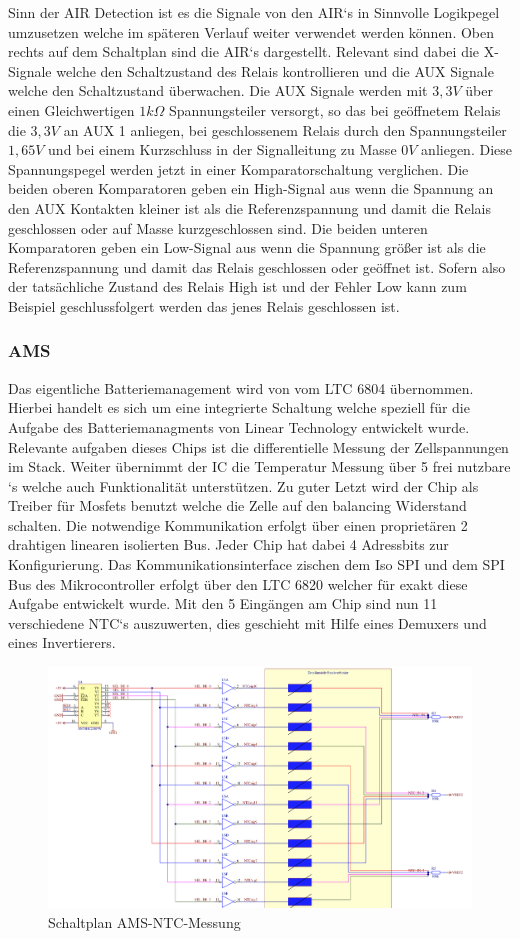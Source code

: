 Sinn der \ac{AIR} Detection ist es die Signale von den \ac{AIR}`s in Sinnvolle Logikpegel umzusetzen welche im späteren Verlauf weiter verwendet werden können. Oben rechts auf dem Schaltplan sind die \ac{AIR}`s dargestellt. Relevant sind dabei die X-Signale welche den Schaltzustand des Relais kontrollieren und die \ac{AUX} Signale welche den Schaltzustand überwachen. Die \ac{AUX} Signale werden mit \ensuremath{3,3V} über einen Gleichwertigen \ensuremath{1 k\Omega} Spannungsteiler versorgt, so das bei geöffnetem Relais die \ensuremath{3,3V} an \ac{AUX} 1 anliegen, bei geschlossenem Relais durch den Spannungsteiler \ensuremath{1,65V} und bei einem Kurzschluss in der Signalleitung zu Masse \ensuremath{0V} anliegen. Diese Spannungspegel werden jetzt in einer Komparatorschaltung verglichen. Die beiden oberen Komparatoren geben ein High-Signal aus wenn die Spannung an den \ac{AUX} Kontakten kleiner ist als die Referenzspannung und damit die Relais geschlossen oder auf Masse kurzgeschlossen sind. Die beiden unteren Komparatoren geben ein Low-Signal aus wenn die Spannung größer ist als die Referenzspannung und damit das Relais geschlossen oder geöffnet ist. Sofern also der tatsächliche Zustand des Relais High ist und der Fehler Low kann zum Beispiel geschlussfolgert werden das jenes Relais geschlossen ist.
\FloatBarrier
\subsubsection{\ac{AMS}}
Das eigentliche Batteriemanagement wird von vom LTC 6804 übernommen. Hierbei handelt es sich um eine integrierte Schaltung welche speziell für die Aufgabe des Batteriemanagments von Linear Technology entwickelt wurde. Relevante aufgaben dieses Chips ist die differentielle Messung der Zellspannungen im Stack. Weiter übernimmt der IC die Temperatur Messung über 5 frei nutzbare `s welche auch  Funktionalität unterstützen. Zu guter Letzt wird der Chip als Treiber für Mosfets benutzt welche die Zelle auf den balancing Widerstand schalten. Die notwendige Kommunikation erfolgt über einen proprietären 2 drahtigen linearen isolierten  Bus. Jeder Chip hat dabei 4 Adressbits zur Konfigurierung. Das Kommunikationsinterface zischen dem Iso \ac{SPI} und dem \ac{SPI} Bus des Mikrocontroller erfolgt über den LTC 6820 welcher für exakt diese Aufgabe entwickelt wurde. Mit den 5 Eingängen am Chip sind nun 11 verschiedene NTC`s auszuwerten, dies geschieht mit Hilfe eines Demuxers und eines Invertierers.
\begin{figure}
	\centering
	\includegraphics[width=0.7\linewidth]{bilder/AMS_NTC_Measurement}
	\caption{Schaltplan \ac{AMS}-\ac{NTC}-Messung}
	\label{fig:amsntcmeasurement}
\end{figure}

